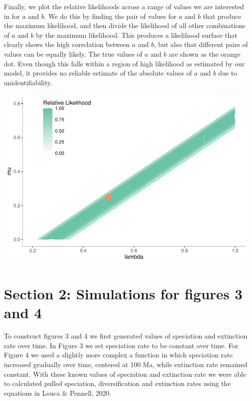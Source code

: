 \documentclass[
]{article}
\begin{document}
Finally, we plot the relative likelihoods across a range of values we
are interested in for \(a\) and \(b\). We do this by finding the pair of
values for \(a\) and \(b\) that produce the maximum likelihood, and then
divide the likelihood of all other combinations of \(a\) and \(b\) by
the maximum likelihood. This produces a likelihood surface that clearly
shows the high correlation between \(a\) and \(b\), but also that
different pairs of values can be equally likely. The true values of
\(a\) and \(b\) are shown as the orange dot. Even though this falls
within a region of high likelihood as estimated by our model, it
provides no reliable estimate of the absolute values of \(a\) and \(b\)
due to unidentifiability.

\includegraphics{supplement_files/figure-latex/plot3-1.pdf}

\pagebreak

\hypertarget{section-2-simulations-for-figures-3-and-4}{%
\section{Section 2: Simulations for figures 3 and
4}\label{section-2-simulations-for-figures-3-and-4}}

To construct figures 3 and 4 we first generated values of speciation and
extinction rate over time. In Figure 3 we set speciation rate to be
constant over time. For Figure 4 we used a slightly more complex a
function in which speciation rate increased gradually over time,
centered at 100 Ma, while extinction rate remained constant. With these
known values of speciation and extinction rate we were able to
calculated pulled speciation, diversification and extinction rates using
the equations in Louca \& Pennell, 2020.
\end{document}
